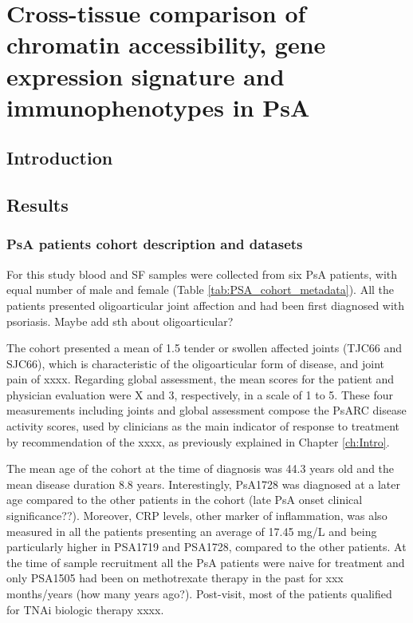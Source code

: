 \chapter{Cross-tissue comparison of chromatin accessibility, gene expression signature and immunophenotypes in PsA}
\label{ch:Results3}


\section{Introduction}
%

\section{Results}
%

\subsection{PsA patients cohort description and datasets}
For this study blood and SF samples were collected from six PsA patients, with equal number of male and female (Table \ref{tab:PSA_cohort_metadata}). All the patients presented oligoarticular joint affection and had been first diagnosed with psoriasis. Maybe add sth about oligoarticular?

The cohort presented a mean of 1.5 tender or swollen affected joints (TJC66 and SJC66), which is characteristic of the oligoarticular form of disease, and joint pain of xxxx. Regarding global assessment, the mean scores for the patient and physician evaluation were X and 3, respectively, in a scale of 1 to 5. These four measurements including joints and global assessment compose the PsARC disease activity scores, used by clinicians as the main indicator of response to treatment by recommendation of the xxxx, as previously explained in Chapter \ref{ch:Intro}. 

The mean age of the cohort at the time of diagnosis was 44.3 years old and the mean disease duration 8.8 years. Interestingly, PsA1728 was diagnosed at a later age compared to the other patients in the cohort (late PsA onset clinical significance??). Moreover, CRP levels, other marker of inflammation, was also measured in all the patients presenting an average of 17.45 mg/L and being particularly higher in PSA1719 and PSA1728, compared to the other patients. At the time of sample recruitment all the PsA patients were naive for treatment and only PSA1505 had been on methotrexate therapy in the past for xxx months/years (how many years ago?). Post-visit, most of the patients qualified for TNAi biologic therapy xxxx.


